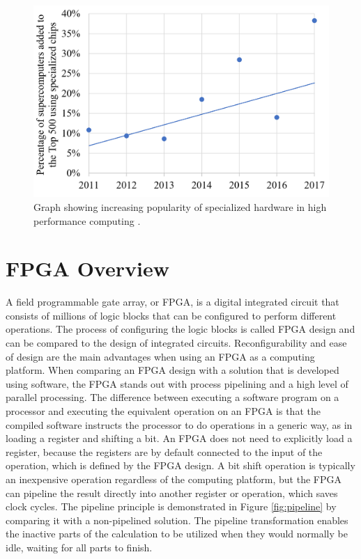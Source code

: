 \documentclass[12pt]{report}
\begin{document}
\begin{figure}
    \centering
    \includegraphics[scale=0.4]{figures/Supercomputers-with-pecialized-chips.png}
    \caption{Graph showing increasing popularity of 
specialized hardware in high performance computing \citep{GenPurpTech}.}
    \label{fig:1}
\end{figure}

\section{FPGA Overview}
A field programmable gate array, or FPGA, is a digital integrated circuit that consists of millions of logic blocks that can be configured to perform different operations. The process of configuring the logic blocks is called FPGA design and can be compared to the design of integrated circuits. Reconfigurability and ease of design are the main advantages when using an FPGA as a computing platform. When comparing an FPGA design with a solution that is developed using software, the FPGA stands out with process pipelining and a high level of parallel processing. The difference between executing a software program on a processor and executing the equivalent operation on an FPGA is that the compiled software instructs the processor to do operations in a generic way, as in loading a register and shifting a bit. An FPGA does not need to explicitly load a register, because the registers are by default connected to the input of the operation, which is defined by the FPGA design. A bit shift operation is typically an inexpensive operation regardless of the computing platform, but the FPGA can pipeline the result directly into another register or operation, which saves clock cycles. The pipeline principle is demonstrated in Figure \ref{fig:pipeline} by comparing it with a non-pipelined solution. The pipeline transformation enables the inactive parts of the calculation to be utilized when they would normally be idle, waiting for all parts to finish. \citep{XilFPGAIntro}
\end{document}

